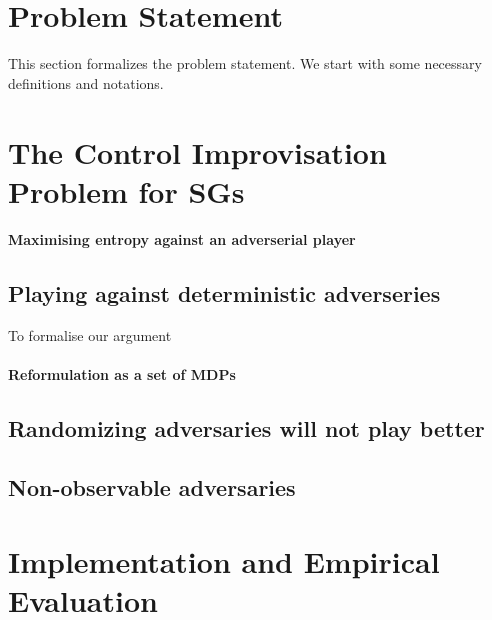 \documentclass[conference]{IEEEtran}
\theoremstyle{remark}
\newcommand{\sg}{\mathcal{G}}
\newcommand{\eventually}[1]{\lozenge^{\leq #1}}
\newcommand{\sched}{\sigma}
\begin{document}

\section{Problem Statement}
\label{sec:problem}
This section formalizes the problem statement.  We start with some necessary definitions and notations.








 
\section{The Control Improvisation Problem for SGs}
\label{sec:sgs}
\paragraph{Maximising entropy against an adverserial player}

\subsection{Playing against deterministic adverseries}
To formalise our argument
\paragraph{Reformulation as a set of MDPs}

\paragraph{}


\subsection{Randomizing adversaries will not play better}

\subsection{Non-observable adversaries}
%


\section{Implementation and Empirical Evaluation}
\label{sec:empirical}




\end{document}
